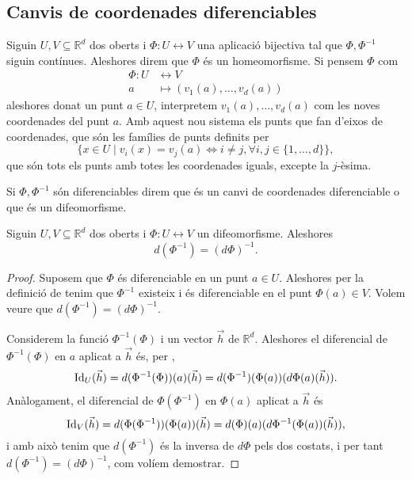 \documentclass[../Apunts.tex]{subfiles}
\begin{document}
	\subsection{Canvis de coordenades diferenciables}
	\begin{definition}
		\label{def:homeomorfisme}
		\label{def:difeomorfisme}
		Siguin \(U,V\subseteq\mathbb{R}^{d}\) dos oberts i \(\Phi\colon U\longleftrightarrow V\) una aplicació bijectiva tal que \(\Phi,\Phi^{-1}\) siguin contínues. Aleshores direm que \(\Phi\) és un homeomorfisme. Si pensem \(\Phi\) com
		\begin{align*}
		\Phi\colon U&\longleftrightarrow V\\
		a&\longmapsto(v_{1}(a),\dots,v_{d}(a))
		\end{align*}
		aleshores donat un punt \(a\in U\), interpretem \(v_{1}(a),\dots,v_{d}(a)\) com les noves coordenades del punt \(a\). Amb aquest nou sistema els punts que fan d'eixos de coordenades, que són les famílies de punts definits per
		\[\{x\in U\mid v_{i}(x)=v_{j}(a)\Leftrightarrow i\neq j,\forall i,j\in\{1,\dots,d\}\},\]
		que són tots els punts amb totes les coordenades iguals, excepte la \(j\)-èsima.
		
		Si \(\Phi,\Phi^{-1}\) són diferenciables direm que és un canvi de coordenades diferenciable o que és un difeomorfisme.
	\end{definition}
	\begin{proposition}\label{prop:difeomorfisme diferenciable invertible}
		Siguin \(U,V\subseteq\mathbb{R}^{d}\) dos oberts i \(\Phi\colon U\longleftrightarrow V\) un difeomorfisme. Aleshores
		\[d(\Phi^{-1})=(d\Phi)^{-1}.\]
		\begin{proof}
			Suposem que \(\Phi\) és diferenciable en un punt \(a\in U\). Aleshores per la definició de  tenim que \(\Phi^{-1}\) existeix i és diferenciable en el punt \(\Phi(a)\in V\). Volem veure que \(d(\Phi^{-1})=(d\Phi)^{-1}\).
			
			Considerem la funció \(\Phi^{-1}(\Phi)\) i un vector \(\vec{h}\) de \(\mathbb{R}^{d}\). Aleshores el diferencial de \(\Phi^{-1}(\Phi)\) en \(a\) aplicat a \(\vec{h}\) és, per ,
			\[\operatorname{Id}_{U}(\vec{h})=d(\Phi^{-1}(\Phi))(a)(\vec{h})=d(\Phi^{-1})(\Phi(a))(d\Phi(a)(\vec{h})).\]
			Anàlogament, el diferencial de \(\Phi(\Phi^{-1})\) en \(\Phi(a)\) aplicat a \(\vec{h}\) és
			\[\operatorname{Id}_{V}(\vec{h})=d(\Phi(\Phi^{-1}))(\Phi(a))(\vec{h})=d(\Phi)(a)(d\Phi^{-1}(\Phi(a))(\vec{h})),\]
			i amb això tenim que \(d(\Phi^{-1})\) és la inversa de \(d\Phi\) pels dos costats, i per tant \(d(\Phi^{-1})=(d\Phi)^{-1}\), com volíem demostrar.
		\end{proof}%
	\end{proposition}
\end{document}
